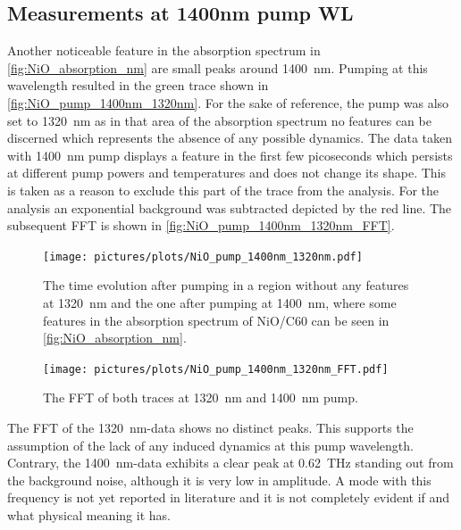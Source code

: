 \subsection{Measurements at 1400nm pump WL}
Another noticeable feature in the absorption spectrum in \autoref{fig:NiO_absorption_nm} are small peaks around \qty{1400}{nm}.
Pumping at this wavelength resulted in the green trace shown in \autoref{fig:NiO_pump_1400nm_1320nm}.
For the sake of reference, the pump was also set to \qty{1320}{nm} as in that area of the absorption spectrum no features can be discerned which represents the absence of any possible dynamics.
The data taken with \qty{1400}{nm} pump displays a feature in the first few picoseconds which persists at different pump powers and temperatures and does not change its shape.
This is taken as a reason to exclude this part of the trace from the analysis.
For the analysis an exponential background was subtracted depicted by the red line.
The subsequent FFT is shown in \autoref{fig:NiO_pump_1400nm_1320nm_FFT}.
\begin{figure}[ht]
    \centering
    \texttt{[image: pictures/plots/NiO\_pump\_1400nm\_1320nm.pdf]} \vspace{-0.3cm}
    \caption{The time evolution after pumping in a region without any features at \qty{1320}{nm} and the one after pumping at \qty{1400}{nm}, where some features in the absorption spectrum of NiO/C60 can be seen in \autoref{fig:NiO_absorption_nm}.}
    \label{fig:NiO_pump_1400nm_1320nm}
\end{figure}
\begin{figure}[ht]
    \centering
    \texttt{[image: pictures/plots/NiO\_pump\_1400nm\_1320nm\_FFT.pdf]} \vspace{-0.3cm}
    \caption{The FFT of both traces at \qty{1320}{nm} and \qty{1400}{nm} pump.}
    \label{fig:NiO_pump_1400nm_1320nm_FFT}
\end{figure}
\FloatBarrier
The FFT of the \qty{1320}{nm}-data shows no distinct peaks.
This supports the assumption of the lack of any induced dynamics at this pump wavelength.
Contrary, the \qty{1400}{nm}-data exhibits a clear peak at \qty{0.62}{THz} standing out from the background noise, although it is very low in amplitude.
A mode with this frequency is not yet reported in literature and it is not completely evident if and what physical meaning it has.

